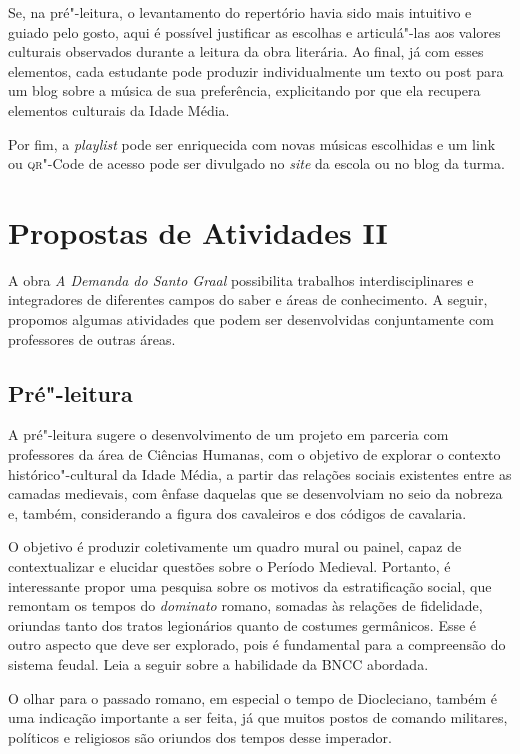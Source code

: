 \documentclass[11pt]{extarticle}
\begin{document}
Se, na pré"-leitura, o levantamento do repertório havia
sido mais intuitivo e guiado pelo gosto, aqui é possível justificar as
escolhas e articulá"-las aos valores culturais observados durante a
leitura da obra literária. Ao final, já com esses elementos, cada
estudante pode produzir individualmente um texto ou post para um blog
sobre a música de sua preferência, explicitando por que ela recupera
elementos culturais da Idade Média.

Por fim, a \emph{playlist} pode ser enriquecida com novas músicas
escolhidas e um link ou \textsc{qr}"-Code de acesso pode ser divulgado no
\emph{site} da escola ou no blog da turma.


\section{Propostas de Atividades II}

A obra \emph{A Demanda do Santo Graal} possibilita trabalhos
interdisciplinares e integradores de diferentes campos do saber e áreas
de conhecimento. A seguir, propomos algumas atividades que podem ser
desenvolvidas conjuntamente com professores de outras áreas.

\subsection{Pré"-leitura}

A pré"-leitura sugere o desenvolvimento de um projeto em
parceria com professores da área de Ciências Humanas, com o objetivo de
explorar o contexto histórico"-cultural da Idade Média, a partir das
relações sociais existentes entre as camadas medievais, com ênfase
daquelas que se desenvolviam no seio da nobreza e, também, considerando
a figura dos cavaleiros e dos códigos de cavalaria.

O objetivo é produzir coletivamente um quadro mural ou painel, capaz de
contextualizar e elucidar questões sobre o Período Medieval. Portanto, é
interessante propor uma pesquisa sobre os motivos da estratificação
social, que remontam os tempos do \emph{dominato} romano, somadas às
relações de fidelidade, oriundas tanto dos tratos legionários quanto de
costumes germânicos. Esse é outro aspecto que deve ser explorado, pois é
fundamental para a compreensão do sistema feudal.
Leia a seguir sobre a habilidade da BNCC abordada.

O olhar para o passado romano, em especial o tempo de Diocleciano,
também é uma indicação importante a ser feita, já que muitos postos de
comando militares, políticos e religiosos são oriundos dos tempos desse
imperador.
\end{document}
